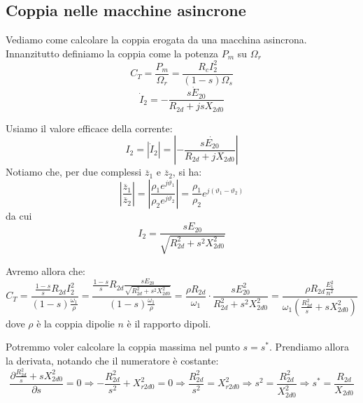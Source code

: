 \documentclass[a4paper,11pt]{article}
\begin{document}
\subsection{Coppia nelle macchine asincrone}
Vediamo come calcolare la coppia erogata da una macchina asincrona.
Innanzitutto definiamo la coppia come la potenza $P_m$ su $\Omega_r$ 
$$
C_T = \frac{P_m}{\Omega_r} = \frac{R_c I_2^2}{(1 - s) \Omega_s}
$$
$$
\dot{I}_2 = -\frac{s \dot{E}_{20}}{R_{2d} + js X_{2d0}}
$$

Usiamo il valore efficace della corrente:
$$
I_2 = |\dot{I}_2| = \left| -\frac{s \dot{E_{20}}}{R_{2d} + j X_{2d0}} \right|
$$
Notiamo che, per due complessi $\overline{z}_1$ e $\overline{z}_2$, si ha:
$$
\left| \frac{\overline{z}_1}{\overline{z}_2} \right| = \left| \frac{\rho_1 e^{j \vartheta_1}}{\rho_2 e^{j \vartheta_2}} \right| = \frac{\rho_1}{\rho_2} e^{j(\vartheta_1 - \vartheta_2)}
$$
da cui
$$
I_2 = \frac{s E_{20}}{\sqrt{R_{2d}^2 + s^2 X_{2d0}^2}}
$$

Avremo allora che:
$$
C_T = \frac{\frac{1-s}{s}R_{2d} I_2^2}{(1 - s) \frac{\omega_1}{\rho}} = \frac{\frac{1-s}{s}R_{2d}  \frac{s E_{20}}{\sqrt{R_{2d}^2 + s^2 X_{2d0}^2}} }{(1 - s) \frac{\omega_1}{\rho}} = \frac{\rho R_{2d}}{\omega_1} \cdot \frac{s E_{20}^2}{R_{2d}^2 + s^2 X^2_{2d0}} = \frac{\rho R_{2d} \frac{E_1^2}{n^2}}{\omega_1 \left( \frac{R_{2d}^2}{s}  + s X_{2d0}^2 \right)}
$$
dove $\rho$ è la coppia dipolie $n$ è il rapporto dipoli.

\begin{center}
\end{center}


Potremmo voler calcolare la coppia massima nel punto $s = s^*$.
Prendiamo allora la derivata, notando che il numeratore è costante:
$$
\frac{\partial \frac{R_{2d}^2}{s} + s X_{2d0}^2}{\partial s} = 0 \Rightarrow - \frac{R_{2d}^2}{s^2} + X^2_{r2d0} = 0 \Rightarrow  \frac{R_{2d}^2}{s^2} = X^2_{r2d0} \Rightarrow s^2 = \frac{R_{2d}^2}{X_{2d0}^2} \Rightarrow s^* = \frac{R_{2d}}{X_{2d0}}
$$
\end{document}
